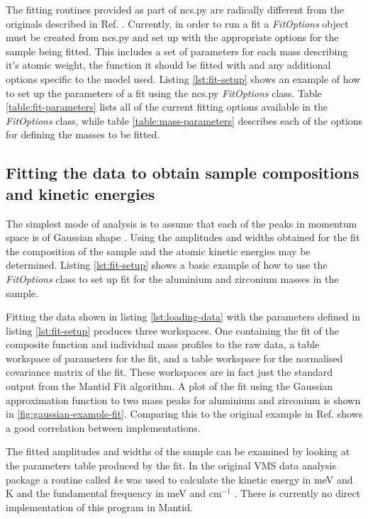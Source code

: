 \documentclass[paper=a4, fontsize=11pt]{scrartcl}	%
\numberwithin{equation}{section}															%
\numberwithin{figure}{section}																%
\numberwithin{table}{section}
\begin{document}
The fitting routines provided as part of ncs.py are radically different from the originals described in Ref. \cite{mayers2010user}. Currently, in order to run a fit a \textit{FitOptions} object must be created from ncs.py and set up with the appropriate options for the sample being fitted. This includes a set of parameters for each mass describing it's atomic weight, the function it should be fitted with and any additional options specific to the model used. Listing \ref{lst:fit-setup} shows an example of how to set up the parameters of a fit using the ncs.py \textit{FitOptions} class. Table \ref{table:fit-parameters} lists all of the current fitting options available in the \textit{FitOptions} class, while table \ref{table:mass-parameters} describes each of the options for defining the masses to be fitted.

\subsection{Fitting the data to obtain sample compositions and kinetic energies}
\label{subsec:fitting-composition-kinetic}

The simplest mode of analysis is to assume that each of the peaks in momentum space is of Gaussian shape \cite{mayers2004vesuvio}. Using the amplitudes and widths obtained for the fit the composition of the sample and the atomic kinetic energies may be determined. Listing \ref{lst:fit-setup} shows a basic example of how to use the \textit{FitOptions} class to set up fit for the aluminium and zirconium masses in the sample.

Fitting the data shown in listing \ref{lst:loading-data} with the parameters defined in listing \ref{lst:fit-setup} produces three workspaces. One containing the fit of the composite function and individual mass profiles to the raw data, a table workspace of parameters for the fit, and a table workspace for the normalised covariance matrix of the fit. These workspaces are in fact just the standard output from the Mantid Fit algorithm. A plot of the fit using the Gaussian approximation function to two mass peaks for aluminium and zirconium is shown in \ref{fig:gaussian-example-fit}. Comparing this to the original example in Ref. \cite{mayers2010user} shows a good correlation between implementations.

The fitted amplitudes and widths of the sample can be examined by looking at the parameters table produced by the fit. In the original VMS data analysis package a routine called \textit{ke} was used to calculate the kinetic energy in meV and K and the fundamental frequency in meV and cm$^{-1}$ \cite{mayers2010user}. There is currently no direct implementation of this program in Mantid.
\end{document}
